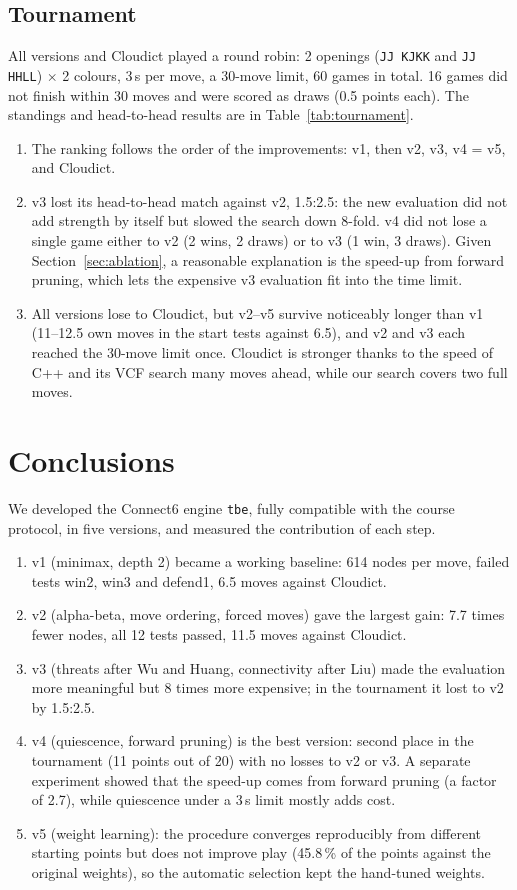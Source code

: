 \documentclass[a4paper,10pt,twocolumn]{article}
\newenvironment{points}{\begin{enumerate}[label=(\arabic*),leftmargin=*,itemsep=2pt,topsep=3pt]}{\end{enumerate}}
\newcommand{\code}[1]{\texttt{#1}}
\begin{document}
\subsection{Tournament}
All versions and Cloudict played a round robin: 2 openings (\code{JJ KJKK} and \code{JJ HHLL}) $\times$ 2 colours, 3\,s per move, a 30-move limit, 60 games in total. 16 games did not finish within 30 moves and were scored as draws (0.5 points each). The standings and head-to-head results are in Table~\ref{tab:tournament}.
\begin{points}
\item The ranking follows the order of the improvements: v1, then v2, v3, v4 = v5, and Cloudict.
\item v3 lost its head-to-head match against v2, 1.5:2.5: the new evaluation did not add strength by itself but slowed the search down 8-fold. v4 did not lose a single game either to v2 (2 wins, 2 draws) or to v3 (1 win, 3 draws). Given Section~\ref{sec:ablation}, a reasonable explanation is the speed-up from forward pruning, which lets the expensive v3 evaluation fit into the time limit.
\item All versions lose to Cloudict, but v2--v5 survive noticeably longer than v1 (11--12.5 own moves in the start tests against 6.5), and v2 and v3 each reached the 30-move limit once. Cloudict is stronger thanks to the speed of C++ and its VCF search many moves ahead, while our search covers two full moves.
\end{points}

\section{Conclusions}\label{sec:concl}

We developed the Connect6 engine \code{tbe}, fully compatible with the course protocol, in five versions, and measured the contribution of each step.
\begin{points}
\item v1 (minimax, depth 2) became a working baseline: 614 nodes per move, failed tests win2, win3 and defend1, 6.5 moves against Cloudict.
\item v2 (alpha-beta, move ordering, forced moves) gave the largest gain: 7.7 times fewer nodes, all 12 tests passed, 11.5 moves against Cloudict.
\item v3 (threats after Wu and Huang, connectivity after Liu) made the evaluation more meaningful but 8 times more expensive; in the tournament it lost to v2 by 1.5:2.5.
\item v4 (quiescence, forward pruning) is the best version: second place in the tournament (11 points out of 20) with no losses to v2 or v3. A separate experiment showed that the speed-up comes from forward pruning (a factor of 2.7), while quiescence under a 3\,s limit mostly adds cost.
\item v5 (weight learning): the procedure converges reproducibly from different starting points but does not improve play (45.8\,\% of the points against the original weights), so the automatic selection kept the hand-tuned weights.
\end{points}
\end{document}
